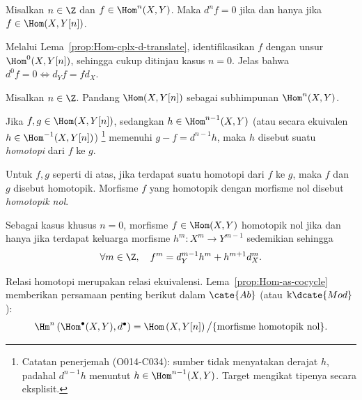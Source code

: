 \begin{lema}\label{prop:Hom-as-cocycle}
	Misalkan $n\in\Z$ dan $f\in\Hom^n(X,Y)$. Maka $d^nf=0$ jika dan hanya
	jika $f\in\Hom(X,Y[n])$.
\end{lema}
\begin{bukti}
	Melalui Lema~\ref{prop:Hom-cplx-d-translate}, identifikasikan $f$ dengan
	unsur $\Hom^0(X,Y[n])$, sehingga cukup ditinjau kasus $n=0$.
	Jelas bahwa $d^0f=0\iff d_Yf=fd_X$.
\end{bukti}

\begin{definisi}\label{def:homotopy}
	Misalkan $n\in\Z$. Pandang $\Hom(X,Y[n])$ sebagai subhimpunan
	$\Hom^n(X,Y)$.
	\begin{compactitem}
		\item Jika $f,g\in\Hom(X,Y[n])$, sedangkan
		$h\in\Hom^{n-1}(X,Y)$ (atau secara ekuivalen
		$h\in\Hom^{-1}(X,Y[n])$)%
		\footnote{Catatan penerjemah (O014-C034): sumber tidak menyatakan
		derajat $h$, padahal $d^{n-1}h$ menuntut
		$h\in\Hom^{n-1}(X,Y)$. Target mengikat tipenya secara eksplisit.}
		memenuhi $g-f=d^{n-1}h$, maka $h$ disebut
		suatu \emph{homotopi} dari $f$ ke $g$.
		\item Untuk $f,g$ seperti di atas, jika terdapat suatu homotopi dari
		$f$ ke $g$, maka $f$ dan $g$ disebut homotopik. Morfisme $f$ yang
		homotopik dengan morfisme nol disebut \emph{homotopik nol}.
	\end{compactitem}

	Sebagai kasus khusus $n=0$, morfisme $f\in\Hom(X,Y)$ homotopik nol jika
	dan hanya jika terdapat keluarga morfisme $h^m:X^m\to Y^{m-1}$ sedemikian
	sehingga
	\[ \forall m \in \Z, \quad f^m = d_Y^{m-1} h^m + h^{m+1} d_X^m . \]
\end{definisi}

Relasi homotopi merupakan relasi ekuivalensi.
Lema~\ref{prop:Hom-as-cocycle}
memberikan persamaan penting berikut dalam $\cate{Ab}$ (atau
$\Bbbk\dcate{Mod}$):
\[ \Hm^n\left(\Hom^\bullet(X, Y), d^\bullet \right) = \Hom\left(X, Y[n]\right) \big/ \{\text{morfisme homotopik nol} \}. \]

